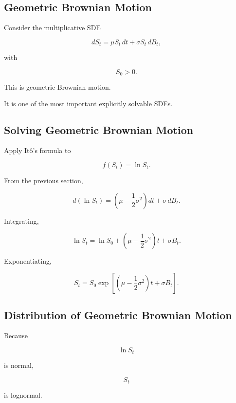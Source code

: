 \subsection{Geometric Brownian Motion}
\label{subsec:geometric-brownian-motion}

Consider the multiplicative SDE

\[
\boxed{
dS_t
=
\mu S_t\,dt
+
\sigma S_t\,dB_t,
}
\]

with

\[
S_0>0.
\]

This is geometric Brownian motion.

It is one of the most important explicitly solvable SDEs.

\subsection{Solving Geometric Brownian Motion}
\label{subsec:solve-geometric-brownian}

Apply It\^o's formula to

\[
f(S_t)
=
\ln S_t.
\]

From the previous section,

\[
d(\ln S_t)
=
\left(
\mu-\frac12\sigma^2
\right)dt
+
\sigma\,dB_t.
\]

Integrating,

\[
\ln S_t
=
\ln S_0
+
\left(
\mu-\frac12\sigma^2
\right)t
+
\sigma B_t.
\]

Exponentiating,

\[
\boxed{
S_t
=
S_0
\exp
\left[
\left(
\mu-\frac12\sigma^2
\right)t
+
\sigma B_t
\right].
}
\]

\subsection{Distribution of Geometric Brownian Motion}
\label{subsec:gbm-distribution}

Because

\[
\ln S_t
\]

is normal,

\[
S_t
\]

is lognormal.

